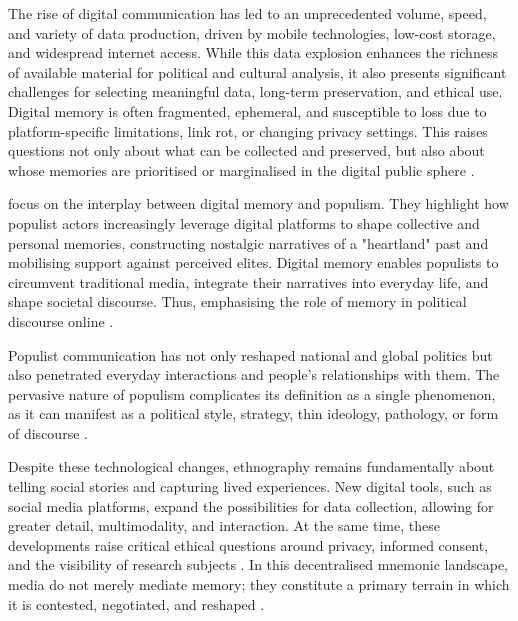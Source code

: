 The rise of digital communication has led to an unprecedented volume, speed, and variety of data production, driven by mobile technologies, low-cost storage, and widespread internet access. While this data explosion enhances the richness of available material for political and cultural analysis, it also presents significant challenges for selecting meaningful data, long-term preservation, and ethical use. Digital memory is often fragmented, ephemeral, and susceptible to loss due to platform-specific limitations, link rot, or changing privacy settings. This raises questions not only about what can be collected and preserved, but also about whose memories are prioritised or marginalised in the digital public sphere \citep{van_house_technologies_2008}.

\citet{menke_digital_2023} focus on the interplay between digital memory and populism. They highlight how populist actors increasingly leverage digital platforms to shape collective and personal memories, constructing nostalgic narratives of a "heartland" past and mobilising support against perceived elites. Digital memory enables populists to circumvent traditional media, integrate their narratives into everyday life, and shape societal discourse. Thus, emphasising the role of memory in political discourse online \citep{menke_digital_2023}.

Populist communication has not only reshaped national and global politics but also penetrated everyday interactions and people's relationships with them. The pervasive nature of populism complicates its definition as a single phenomenon, as it can manifest as a political style, strategy, thin ideology, pathology, or form of discourse \citep{menke_digital_2023}.

Despite these technological changes, ethnography remains fundamentally about telling social stories and capturing lived experiences. New digital tools, such as social media platforms, expand the possibilities for data collection, allowing for greater detail, multimodality, and interaction. At the same time, these developments raise critical ethical questions around privacy, informed consent, and the visibility of research subjects \citep{murthy_digital_2008}. In this decentralised mnemonic landscape, media do not merely mediate memory; they constitute a primary terrain in which it is contested, negotiated, and reshaped \citep{wasilewski_radical-right_2023}.

